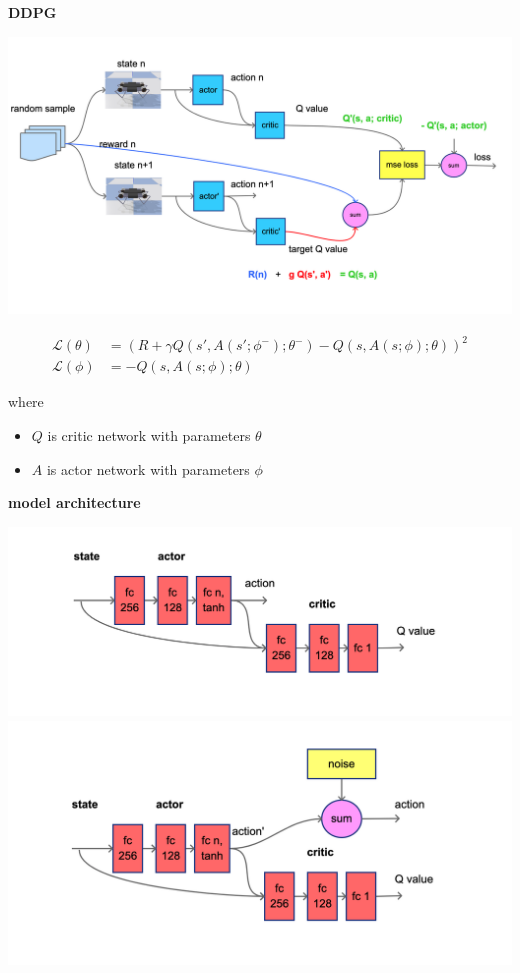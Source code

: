 \documentclass[xcolor=dvipsnames]{beamer}
\begin{document}
\begin{frame}{\bf DDPG}

  {\centering \includegraphics[scale=0.08]{../diagrams/basic/ddpgtraining.png}}

  \begin{align*}
    \mathcal{L(\theta)} &= \left( R + \gamma Q(s', A(s'; \phi^-); \theta^-) - Q(s, A(s; \phi); \theta)  \right)^2 \\
    \mathcal{L(\phi)} &= -Q(s, A(s; \phi); \theta)
  \end{align*}

  where
  \begin{itemize}
    \item $Q$ is critic network with parameters $\theta$
    \item $A$ is actor network with parameters $\phi$
  \end{itemize}
  
\end{frame}


\begin{frame}{\bf model architecture}

  {\centering \includegraphics[scale=0.12]{../diagrams/architectures/ddpgbasic.png}}
  {\centering \includegraphics[scale=0.12]{../diagrams/architectures/ddpgexploration.png}}

\end{frame}
\end{document}
